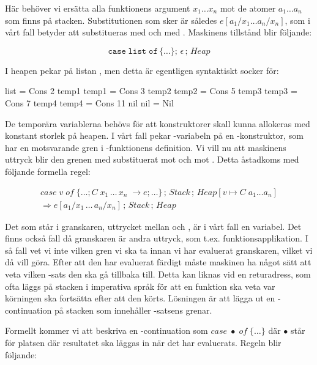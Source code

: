\documentclass[../Core]{subfiles}
\begin{document}
Här behöver vi ersätta alla funktionens argument $x_{1}\ldots x_{n}$ mot
de atomer $a_{1}\ldots a_{n}$ som finns på stacken. Substitutionen som sker är 
således $e[a{}_{1}/x_{1}\ldots a_{n}/x_{n}]$, som i vårt fall betyder att
 substitueras med  och  med . Maskinens tillstånd blir följande:

\[
\mathtt{case\; list\; of\,\lbrace\ldots\rbrace};\,\epsilon\,;\, Heap\]


I heapen pekar  på listan \ic{[2,3,5,7,11]}, men detta är egentligen syntaktiskt socker
för:

\begin{codeEx}
list = Cons 2 temp1
temp1 = Cons 3 temp2
temp2 = Cons 5 temp3
temp3 = Cons 7 temp4
temp4 = Cons 11 nil
nil = Nil
\end{codeEx}

De temporära variablerna behövs för att konstruktorer skall kunna
allokeras med konstant storlek på heapen. I vårt fall pekar
-variabeln på en -konstruktor, som har en motsvarande gren
i -funktionens definition. Vi vill nu att maskinens uttryck
blir den grenen med  substituerat mot  och  mot .
Detta åstadkoms med följande formella regel:

\begin{multline*}
case\; v\; of\;\{\ldots;C\; x_{1}\,\ldots\, x_{n}\;\rightarrow e;\ldots\}\,;\, Stack\,;\, Heap[v\mapsto C\; a_{1}\ldots a_{n}]\\
\Rightarrow e[a_{1}/x_{1}\,\ldots\, a_{n}/x_{n}]\,;\, Stack\,;\, Heap\end{multline*}


Det som står i granskaren, uttrycket mellan  och , är i vårt
fall en variabel. Det finns också fall då granskaren är andra uttryck, som
t.ex. funktionsapplikation. I så fall vet vi inte vilken gren vi ska
ta innan vi har evaluerat granskaren, vilket vi då vill göra.
Efter att den har evaluerat färdigt måste maskinen ha något sätt att
veta vilken -sats den ska gå tillbaka till. Detta kan liknas
vid en returadress, som ofta läggs på stacken i imperativa språk för att
en funktion ska veta var körningen ska fortsätta efter att den körts.
Lösningen är att lägga ut en -continuation på stacken
som innehåller -satsens grenar.

Formellt kommer vi att beskriva en -continuation som $case\;\bullet\; of\;\{\ldots\}$
där $\bullet$ står för platsen där resultatet ska läggas in när det har evaluerats. Regeln
blir följande:
\end{document}
